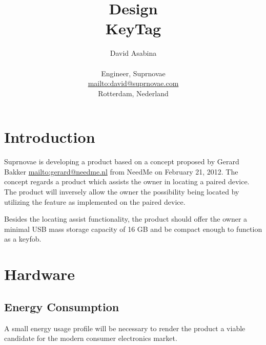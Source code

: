 

\newcommand{\client}{NeedMe* }
\newcommand{\product}{Key*\ }


\author{David Asabina\\\\
  Engineer, Suprnovae \\
  \url{mailto:david@suprnovae.com}\\
  Rotterdam, Nederland
}
\title{\textbf{Design}\\{KeyTag}}
\maketitle
\thispagestyle{empty}

%

\clearpage
{}
\section{Introduction}
\label{Introduction}
Suprnovae is developing a product based on a concept proposed by Gerard Bakker \url{mailto:gerard@needme.nl}
from NeedMe on February 21, 2012. The concept regards a product which assists the owner in locating a paired 
device. The product will inversely allow the owner the possibility being located by utilizing 
the feature as implemented on the paired device. 

Besides the locating assist functionality, the product should offer the owner a minimal USB mass 
storage capacity of 16 GB and be compact enough to function as a keyfob.

\clearpage
\section{Hardware}
\subsection{Energy Consumption}
A small energy usage profile will be necessary to render the product a viable candidate for the modern
consumer electronics market. 

